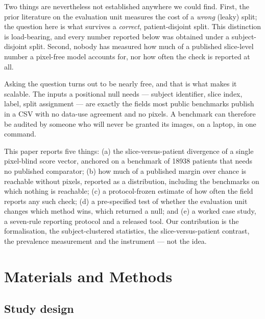 \documentclass[11pt,a4paper]{article}
\begin{document}
Two things are nevertheless not established anywhere we could find. First, the
prior literature on the evaluation unit measures the cost of a \emph{wrong}
(leaky) split; the question here is what survives a \emph{correct},
patient-disjoint split. This distinction is load-bearing, and every number
reported below was obtained under a subject-disjoint split. Second, nobody has
measured how much of a published slice-level number a pixel-free model accounts
for, nor how often the check is reported at all.

Asking the question turns out to be nearly free, and that is what makes it
scalable. The inputs a positional null needs --- subject identifier, slice index,
label, split assignment --- are exactly the fields most public benchmarks
publish in a CSV with no data-use agreement and no pixels. A benchmark can
therefore be audited by someone who will never be granted its images, on a
laptop, in one command.

This paper reports five things: (a) the slice-versus-patient divergence of a
single pixel-blind score vector, anchored on a benchmark of \num{18938}
patients that needs no published comparator; (b) how much of a published margin
over chance is reachable without pixels, reported as a distribution, including
the benchmarks on which nothing is reachable; (c) a protocol-frozen estimate of
how often the field reports any such check; (d) a pre-specified test of whether
the evaluation unit changes which method wins, which returned a null; and (e) a
worked case study, a seven-rule reporting protocol and a released tool. Our
contribution is the formalisation, the subject-clustered statistics, the
slice-versus-patient contrast, the prevalence measurement and the instrument ---
not the idea.

\section{Materials and Methods}

\subsection{Study design}
\end{document}
